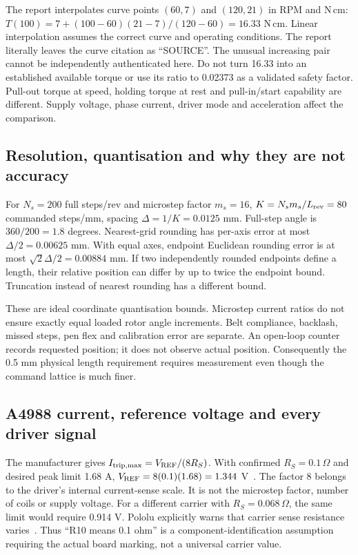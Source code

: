 The report interpolates curve points $(60,7)$ and $(120,21)$ in RPM and
N\,cm: $T(100)=7+(100-60)(21-7)/(120-60)=16.33$ N\,cm.
Linear interpolation assumes the correct curve and operating conditions.
The report literally leaves the curve citation as ``SOURCE''. The unusual
increasing pair cannot be independently authenticated here. Do not turn
16.33 into an established available torque or use its ratio to 0.02373 as
a validated safety factor. Pull-out torque at speed, holding torque at rest
and pull-in/start capability are different. Supply voltage, phase current,
driver mode and acceleration affect the comparison.

\subsection{Resolution, quantisation and why they are not accuracy}
For $N_s=200$ full steps/rev and microstep factor $m_s=16$,
$K=N_sm_s/L_{\rm rev}=80$ commanded steps/mm, spacing
$\Delta=1/K=0.0125$ mm. Full-step angle is $360/200=1.8$ degrees.
Nearest-grid rounding has per-axis error at most $\Delta/2=0.00625$ mm.
With equal axes, endpoint Euclidean rounding error is at most
$\sqrt2\Delta/2=0.00884$ mm. If two independently rounded endpoints define
a length, their relative position can differ by up to twice the endpoint
bound. Truncation instead of nearest rounding has a different bound.

These are ideal coordinate quantisation bounds. Microstep current ratios do
not ensure exactly equal loaded rotor angle increments. Belt compliance,
backlash, missed steps, pen flex and calibration error are separate. An
open-loop counter records requested position; it does not observe actual
position. Consequently the 0.5 mm physical length requirement requires
measurement even though the command lattice is much finer.

\subsection{A4988 current, reference voltage and every driver signal}
The manufacturer gives $I_{\rm trip,max}=V_{\rm REF}/(8R_S)$.
With confirmed $R_S=0.1\,\Omega$ and desired peak limit 1.68 A,
$V_{\rm REF}=8(0.1)(1.68)=1.344$ V~\cite{a4988datasheet}.
The factor 8 belongs to the driver's internal current-sense scale. It is
not the microstep factor, number of coils or supply voltage. For a different
carrier with $R_S=0.068\,\Omega$, the same limit would require 0.914 V.
Pololu explicitly warns that carrier sense resistance varies~\cite{pololu4988}.
Thus ``R10 means 0.1 ohm'' is a component-identification assumption requiring
the actual board marking, not a universal carrier value.

